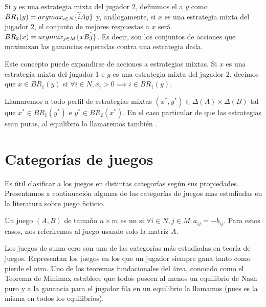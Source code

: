 Si $y$ es una estrategia mixta del jugador $2$, definimos el  a $y$ como $BR_1(y) = argmax_{i \in N}\{\widetilde{i}Ay\}$ y, análogamente, si $x$ es una estrategia mixta del jugador $2$, el conjunto de mejores respuestas a $x$ será $BR_2(x) = argmax_{j \in M}\{xB\widetilde{j}\}$. Es decir, son los conjuntos de acciones que maximizan las ganancias esperadas contra una estrategia dada.

Este concepto puede expandirse de acciones a estrategias mixtas. Si $x$ es una estrategia mixta del jugador 1 e $y$ es una estrategia mixta del jugador 2, decimos que $x \in BR_1(y)$ si $\forall i \in N, x_i > 0 \implies i \in BR_1(y)$.

Llamaremos  a todo perfil de estrategias mixtas $(x^*, y^*) \in \Delta(A) \times \Delta(B)$ tal que $x^* \in BR_1(y^*)$ e $y^* \in BR_2(x^*)$. En el caso particular de que las estrategias sean puras, al equilibrio lo llamaremos también .

\section{Categorías de juegos}

Es útil clasificar a los juegos en distintas categorías según sus propiedades. Presentamos a continuación algunas de las categorías de juegos mas estudiadas en la literatura sobre juego ficticio.

\begin{definition}
    Un juego $(A, B)$ de tamaño $n \times m$ es un  si $\forall i \in N, j \in M : a_{ij} = -b_{ij}$. Para estos casos, nos referiremos al juego usando solo la matriz $A$.
\end{definition}

Los juegos de suma cero son una de las categorías más estudiadas en teoría de juegos. Representan los juegos en los que un jugador siempre gana tanto como pierde el otro. Uno de los teoremas fundacionales del área, conocido como el Teorema de Minimax \cite{nash:minimax} establece que todos poseen al menos un equilibrio de Nash puro y a la ganancia para el jugador fila en un equilibrio la llamamos  (pues es la misma en todos los equilibrios).

